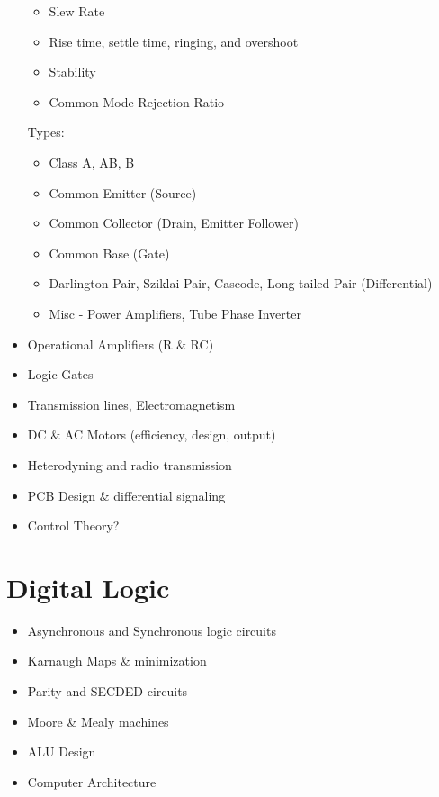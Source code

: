 \documentclass[a4paper]{article}
\begin{document}
\begin{itemize}
\begin{itemize}
  \item Slew Rate
  \item Rise time, settle time, ringing, and overshoot
  \item Stability
  \item Common Mode Rejection Ratio
  \end{itemize}
  Types:
  \begin{itemize}
  \item Class A, AB, B
  \item Common Emitter (Source)
  \item Common Collector (Drain, Emitter Follower)
  \item Common Base (Gate)
  \item Darlington Pair, Sziklai Pair, Cascode, Long-tailed Pair (Differential)
  \item Misc - Power Amplifiers, Tube Phase Inverter
  \end{itemize}
\item Operational Amplifiers (R \& RC)
\item Logic Gates
\item Transmission lines, Electromagnetism
\item DC \& AC Motors (efficiency, design, output)
\item Heterodyning and radio transmission
\item PCB Design \& differential signaling
\item Control Theory?
\end{itemize}

\section{Digital Logic}
\begin{itemize}
\item Asynchronous and Synchronous logic circuits
\item Karnaugh Maps \& minimization
\item Parity and SECDED circuits
\item Moore \& Mealy machines
\item ALU Design
\item Computer Architecture
\end{itemize}

\end{document}
